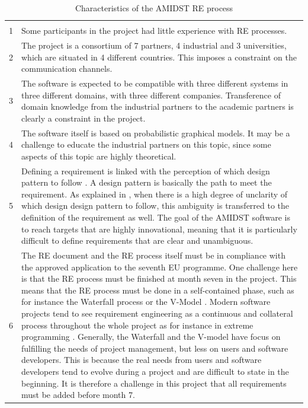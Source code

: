 \documentclass[11pt, oneside]{article}   	%
\begin{document}
\begin{table}
\caption{Characteristics of the AMIDST RE process}
\vspace{1ex}
\begin{tabular}{
>{\raggedright\hspace{0pt}}m{8mm}%
>{\raggedright\hspace{0pt}}p{120mm}}
\hline
& \tabularnewline
1 & Some participants in the project had little experience with RE processes.  \tabularnewline
2 & The project is a consortium of 7 partners, 4 industrial and 3 universities, which are situated in 4 different countries.  This imposes a constraint on the communication channels. \tabularnewline
3 & The software is expected to be compatible with three different systems in three different domains, with three different companies. Transference of domain knowledge from the industrial partners to the academic partners is clearly a constraint in the project. \tabularnewline
4 & The software itself is based on probabilistic graphical models. It may be a challenge to educate the industrial partners on this topic, since some aspects of this topic are highly theoretical.  \tabularnewline
5 & Defining a requirement is linked with the perception of which design pattern to follow \cite{Ral13}.  A design pattern is basically the path to meet the requirement.  As explained in \cite{Ral13}, when there is a high degree of unclarity of which design design pattern to follow, this ambiguity is transferred to the definition of the requirement as well.  The goal of the AMIDST software is to reach targets that are highly innovational, meaning that it is particularly difficult to define requirements that are clear and unambiguous. \tabularnewline
6 & The RE document and the RE process itself must be in compliance with the approved application to the seventh EU programme. One challenge here is that the RE process must be finished at month seven in the project. This means that the RE process must be done in a self-contained phase, such as for instance the Waterfall process \cite{Roy70} or the V-Model \cite{For91}.  Modern software projects tend to see requirement engineering as a continuous and collateral process throughout the whole project as for instance in extreme programming \cite{Bec99}.  Generally, the Waterfall and the V-model have focus on fulfilling the needs of project management, but less on users and software developers.  This is because the real needs from users and software developers tend to evolve during a project and are difficult to state in the beginning.  It is therefore a challenge in this project that all requirements must be added before month 7.
\tabularnewline
\hline
\end{tabular}
\label{tab:characteristic}
\end{table}
\end{document}
